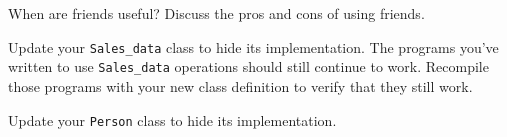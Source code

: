 %
%
\begin{question}
When are friends useful? Discuss the pros and cons of using friends.
\end{question}

\begin{question}
Update your \verb|Sales_data| class to hide its implementation.
The programs you’ve written to use \verb|Sales_data| operations should still
continue to work. Recompile those programs with your new class definition to
verify that they still work.
\end{question}

\begin{question}
Update your \verb|Person| class to hide its implementation.
\end{question}
